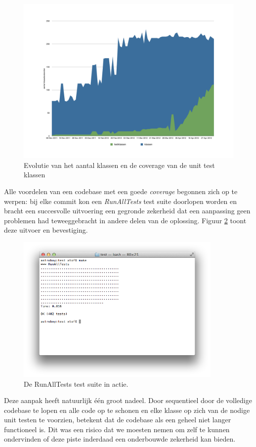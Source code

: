 \documentclass[12pt,a4paper]{report}
\begin{document}
\begin{figure}[htbp]
  \centering
  \includegraphics[width=120mm]{resources/coverage.pdf}
  \caption{Evolutie van het aantal klassen en de coverage van de unit test klassen}
  \label{fig:coverage}
\end{figure}

Alle voordelen van een codebase met een goede \emph{coverage} begonnen zich op te werpen: bij elke commit kon een \emph{RunAllTests} test suite doorlopen worden en bracht een succesvolle uitvoering een gegronde zekerheid dat een aanpassing geen problemen had teweeggebracht in andere delen van de oplossing. Figuur \ref{fig:runalltests} toont deze uitvoer en bevestiging.

\begin{figure}[htbp]
  \centering
  \includegraphics[width=100mm]{resources/runalltests.png}
  \caption{De RunAllTests test suite in actie.}
  \label{fig:runalltests}
\end{figure}

Deze aanpak heeft natuurlijk \'e\'en groot nadeel. Door sequentieel door de volledige codebase te lopen en alle code op te schonen en elke klasse op zich van de nodige unit testen te voorzien, betekent dat de codebase als een geheel niet langer functioneel is. Dit was een risico dat we moesten nemen om zelf te kunnen ondervinden of deze piste inderdaad een onderbouwde zekerheid kan bieden.
\end{document}
